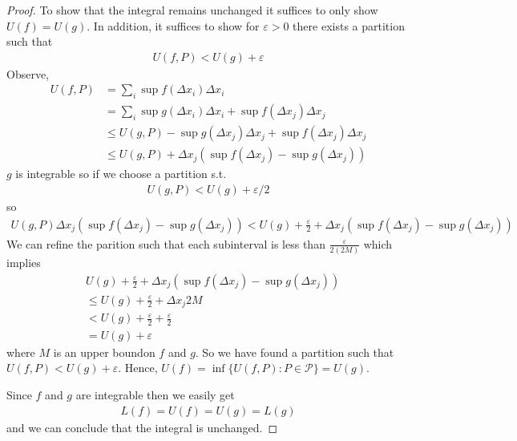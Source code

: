 \begin{enumerate}[label=(\alph*)]
\begin{proof}
        To show that the integral remains unchanged it suffices to only
        show $U(f)=U(g)$. In addition, it suffices to show for $\varepsilon>0$
        there exists a partition such that 
        \begin{align*}
            U(f,P) < U(g)+ \varepsilon
        \end{align*}
        Observe,
        \begin{align*}
            U(f,P) &= \sum_i \sup f(\Delta x_i) \Delta x_i \\
            &= \sum_i \sup g(\Delta x_i) \Delta x_i + \sup f(\Delta x_j) \Delta x_j \\
            &\leq U(g, P) - \sup g(\Delta x_j) \Delta x_j + \sup f(\Delta x_j) \Delta x_j \\
            &\leq U(g, P) + \Delta x_j (\sup f(\Delta x_j) - \sup g(\Delta x_j))
        \end{align*}
        $g$ is integrable so if we choose a partition s.t. 
        \begin{align*}
            U(g, P) < U(g) + \varepsilon/2
        \end{align*}
        so 
        \begin{align*}
            U(g, P) \Delta x_j (\sup f(\Delta x_j) - \sup g(\Delta x_j)) < U(g) + \frac{\varepsilon}{2} + \Delta x_j (\sup f(\Delta x_j) - \sup g(\Delta x_j))
        \end{align*}
        We can refine the parition such that each subinterval is less than $\frac{\varepsilon}{2(2M)}$ 
        which implies 
        \begin{align*}
            & U(g) + \frac{\varepsilon}{2} + \Delta x_j (\sup f(\Delta x_j) - \sup g(\Delta x_j)) \\
            &\leq U(g) + \frac{\varepsilon}{2} + \Delta x_j 2M \\
            &< U(g) + \frac{\varepsilon}{2} + \frac{\varepsilon}{2} \\
            &=  U(g) + \varepsilon
        \end{align*}
        where $M$ is an upper boundon $f$ and $g$.
        So we have found a partition such that $U(f,P) <  U(g) + \varepsilon$.
        Hence, $U(f) = \inf\{ U(f,P) : P \in \mathcal{P} \} = U(g)$.

        Since $f$ and $g$ are integrable then we easily get 
        \begin{align*}
            L(f)=U(f)=U(g)=L(g)
        \end{align*}
        and we can conclude that the integral is unchanged.
    \end{proof}


\end{enumerate}
